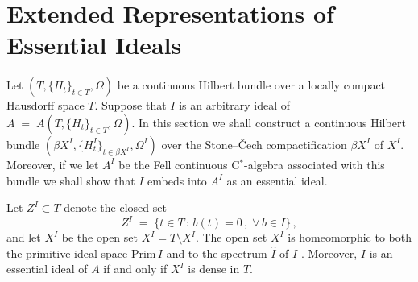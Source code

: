 \documentclass{amsart}
\theoremstyle{definition}
\theoremstyle{remark}
\begin{document}
\section{Extended Representations of Essential Ideals }\label{S:ideal}

 Let  $(T,\{H_t\}_{t\in T},\Omega)$ be a continuous Hilbert bundle over a locally compact Hausdorff space $T$.
Suppose that $I$ is an arbitrary ideal of $A\;=\;A(T,\{H_t\}_{t\in T},\Omega)$.
In this section we shall construct a continuous Hilbert bundle $(\beta X^I, \{H_t^I\}_{t\in \beta X^I},\Omega^{I})$
over the Stone--\v Cech compactification $\beta X^I$ of $X^I$.
Moreover, if we let $A^I$ be the Fell continuous C$^*$-algebra associated with this bundle we shall show that $I$ embeds into $A^I$ as an essential ideal.

Let $Z^I\subset T$ denote the closed set
\[
Z^I\;=\;\{t\in T\,:\,b(t)=0\,,\;\forall\,b\in I\}\,,
\]
and let $X^I$ be the open set $X^I=T\setminus X^I$. The open set $X^I$
is homeomorphic to both the primitive ideal space $\mbox{Prim}\, I $ and to the spectrum  $\hat I$
of $I$ \cite[Proposition A.27]{Raeburn--Williams-book}. Moreover,
$I$ is an essential ideal of $A$ if and only if $X^I$ is dense in $T$.
\end{document}
